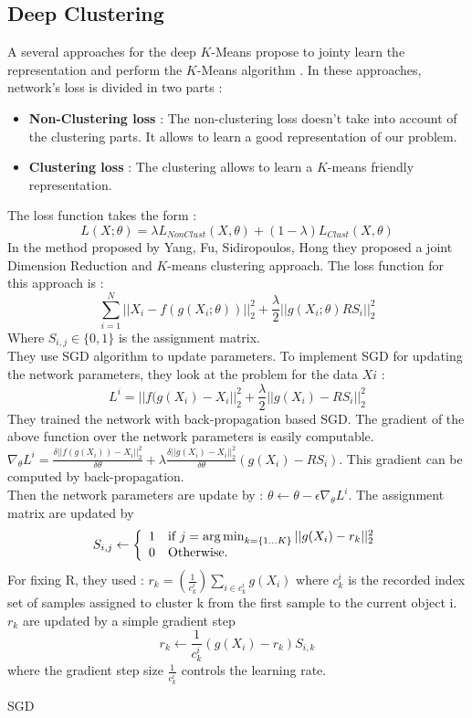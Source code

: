 \subsection{Deep Clustering}\label{seq:DeepClust}
A several approaches for the deep $K$-Means propose to jointy learn the
representation and perform the $K$-Means algorithm \cite{2018arXiv180107648A}.
In these approaches, network's loss is divided in two parts :
\begin{itemize}
\item \textbf{Non-Clustering loss} : The non-clustering loss doesn't
  take into account of the clustering parts. It allows to learn a good
  representation of our problem.
\item \textbf{Clustering loss} : The clustering allows to learn a
  $K$-means friendly representation.
\end{itemize}
The loss function takes the form :
$$
L(X;\theta) = \lambda L_{NonClust}(X,\theta) + (1-\lambda)L_{Clust}
(X,\theta)
$$
In the method proposed by Yang, Fu, Sidiropoulos, Hong \cite{2016arXiv161004794Y}
they proposed a joint Dimension Reduction and
$K$-means clustering approach. The loss function for this approach is :
$$ \sum_{i=1}^N ||X_i - f(g(X_i;\theta))||_2^2 + \frac{\lambda}{2}
||g(X_i;\theta)RS_i||_2^2$$
Where $S_{i, j} \in \{0,1\}$ is the assignment matrix.
\\They use SGD algorithm to update parameters.
To implement SGD for updating the network parameters, they look at
the problem for the data
$Xi$ :
$$ L^i = ||f(g(X_i) -X_i||_2^2 + \frac{\lambda}{2}||g(X_i) -RS_i||_2^2$$
They trained the network with back-propagation based SGD. The
gradient of the above function over the network parameters is easily
computable. $\nabla_\theta L^i = \frac{\delta||f(g(X_i)) -X_i||_2^2}
{\delta\theta} + \lambda\frac{\delta||g(X_i) -X_i||_2^2}{\delta \theta}
(g(X_i) - RS_i)$. This gradient can be computed by back-propagation.\\
Then the network parameters are update by : $\theta \gets \theta -
\epsilon\nabla_\theta L^i$. The assignment matrix are updated by
\begin{equation*}
  S_{i,j} \gets \left\{
\begin{array}{ll}
  1 & \mbox{if } j = \operatorname*{arg\,min}_{k = \{1 ... K\}}||g(X_i) - r_k||_2^2\\
  0 & \mbox{Otherwise.}
\end{array}
\right.
\end{equation*}
For fixing R, they used : $r_k = (\frac{1}{c_k^i})\sum_{i \in c_k^i}
g(X_i)$ where $c_k^i$ is the recorded index set of samples assigned to
cluster k from the first sample to the current object i.
$r_k$ are updated by a simple gradient step
$$r_k \gets \frac{1}{c_k^i}(g(X_i)-r_k)S_{i,k}$$
where the gradient step size $\frac{1}{c_k^i}$ controls the learning
rate.
\begin{algorithm}[!h]
  \caption{SGD}
\end{algorithm}
